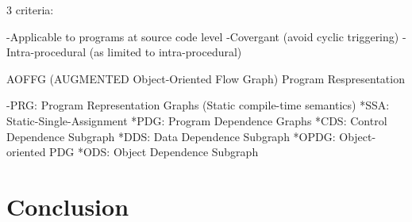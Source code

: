   	3 criteria:

  	-Applicable to programs at source code level
  	-Covergant (avoid cyclic triggering)
  	-Intra-procedural (as limited to intra-procedural)



  AOFFG (AUGMENTED Object-Oriented Flow Graph) Program Respresentation

	-PRG: Program Representation Graphs (Static compile-time semantics)
		*SSA: Static-Single-Assignment
		*PDG: Program Dependence Graphs
			*CDS: Control Dependence Subgraph
			*DDS: Data Dependence Subgraph
		*OPDG: Object-oriented PDG
			*ODS: Object Dependence Subgraph
			



























\section{Conclusion}